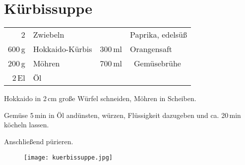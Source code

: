 \section*{K\"{u}rbissuppe}
\begin{centering}
\end{centering}
\begin{table}[H]
\centering
\begin{tabular*}{1\textwidth}{rlrl}
2 & Zwiebeln &&Paprika, edels\"{u}{\ss} \\
600\,g & Hokkaido-K\"{u}rbis & 300\,ml & Orangensaft\\
200\,g & M\"{o}hren & 700\,ml &\ Gem\"{u}sebr\"{u}he \\
2\,El & \"{O}l &&\\
\end{tabular*}
\end{table}
\begin{Notes}
\item Hokkaido in 2\,cm gro{\ss}e W\"{u}rfel schneiden, M\"{o}hren in Scheiben.
\item Gem\"{u}se 5\,min in \"{O}l and\"{u}nsten, w\"{u}rzen, Fl\"{u}ssigkeit
dazugeben und ca. 20\,min k\"{o}cheln lassen.
\item Anschlie{\ss}end p\"{u}rieren.
\end{Notes}
\vfill
\begin{figure}[H]
  \centering
  \texttt{[image: kuerbissuppe.jpg]}
\end{figure}


\newpage
